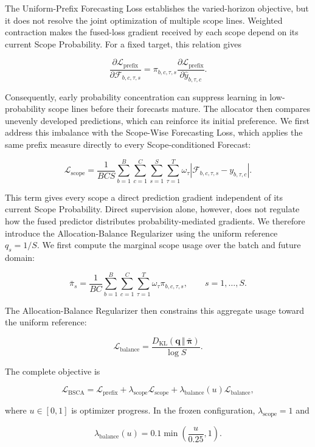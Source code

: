 \documentclass[final,3p,times]{elsarticle}
\begin{document}
The Uniform-Prefix Forecasting Loss establishes the varied-horizon objective, but it does not resolve the joint optimization of multiple scope lines. Weighted contraction makes the fused-loss gradient received by each scope depend on its current Scope Probability. For a fixed target, this relation gives

\[
\frac{
\partial\mathcal L_{\mathrm{prefix}}
}{
\partial\mathcal F_{b,c,\tau,s}
}
=
\pi_{b,c,\tau,s}
\frac{
\partial\mathcal L_{\mathrm{prefix}}
}{
\partial\widehat y_{b,\tau,c}
}.
\]


Consequently, early probability concentration can suppress learning in low-probability scope lines before their forecasts mature. The allocator then compares unevenly developed predictions, which can reinforce its initial preference. We first address this imbalance with the Scope-Wise Forecasting Loss, which applies the same prefix measure directly to every Scope-conditioned Forecast:

\[
\mathcal L_{\mathrm{scope}}
=
\frac{1}{BCS}
\sum_{b=1}^{B}
\sum_{c=1}^{C}
\sum_{s=1}^{S}
\sum_{\tau=1}^{T}
\omega_\tau
\left|
\mathcal F_{b,c,\tau,s}-y_{b,\tau,c}
\right|.
\]


This term gives every scope a direct prediction gradient independent of its current Scope Probability. Direct supervision alone, however, does not regulate how the fused predictor distributes probability-mediated gradients. We therefore introduce the Allocation-Balance Regularizer using the uniform reference $q_s=1/S$. We first compute the marginal scope usage over the batch and future domain:

\[
\bar{\pi}_s
=
\frac{1}{BC}
\sum_{b=1}^{B}
\sum_{c=1}^{C}
\sum_{\tau=1}^{T}
\omega_\tau\pi_{b,c,\tau,s},
\qquad
s=1,\ldots,S.
\]


The Allocation-Balance Regularizer then constrains this aggregate usage toward the uniform reference:

\[
\mathcal L_{\mathrm{balance}}
=
\frac{
D_{\mathrm{KL}}\!\left(
\mathbf q\,\Vert\,\bar{\boldsymbol\pi}
\right)
}{
\log S
}.
\]


The complete objective is

\[
\mathcal L_{\mathrm{BSCA}}
=
\mathcal L_{\mathrm{prefix}}
+
\lambda_{\mathrm{scope}}
\mathcal L_{\mathrm{scope}}
+
\lambda_{\mathrm{balance}}(u)
\mathcal L_{\mathrm{balance}},
\]


where $u\in[0,1]$ is optimizer progress. In the frozen configuration, $\lambda_{\mathrm{scope}}=1$ and

\[
\lambda_{\mathrm{balance}}(u)
=
0.1
\min\!\left(
\frac{u}{0.25},1
\right).
\]
\end{document}
